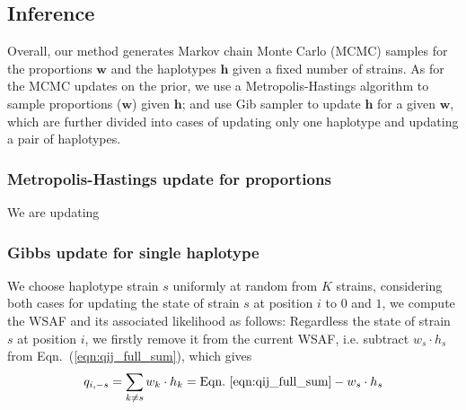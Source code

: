 \documentclass{bioinfo}
\begin{document}



\subsection{Inference}

Overall, our method generates Markov chain Monte Carlo (MCMC) samples for the proportions $\mathbf w$ and the haplotypes $\mathbf h$ given a fixed number of strains. As for the MCMC updates on the prior, we use a Metropolis-Hastings algorithm to sample proportions ($\mathbf w$) given $\mathbf h$; and use Gib sampler to update $\mathbf h$ for a given $\mathbf w$, which are further divided into cases of updating only one haplotype and updating a pair of haplotypes.



\subsubsection{Metropolis-Hastings update for proportions}\label{sec:updateP}

We are updating

\subsubsection{Gibbs update for single haplotype}

We choose haplotype strain $s$ uniformly at random from $K$ strains, considering both cases for updating the state of strain $s$ at position $i$ to $0$ and $1$, we compute the WSAF and its associated likelihood as follows: Regardless the state of strain $s$ at position $i$, we firstly remove it from the current WSAF, i.e. subtract $ w_s \cdot h_s$ from Eqn.~(\ref{eqn:qij_full_sum}), which gives
\begin{equation}
q_{i,-s} = \sum_{k\neq s} w_k \cdot h_k = \textrm{Eqn.~\eqref{eqn:qij_full_sum}} -  w_s \cdot h_s \label{eqn:qij_full_sum_minus_s}
\end{equation}
\end{document}
